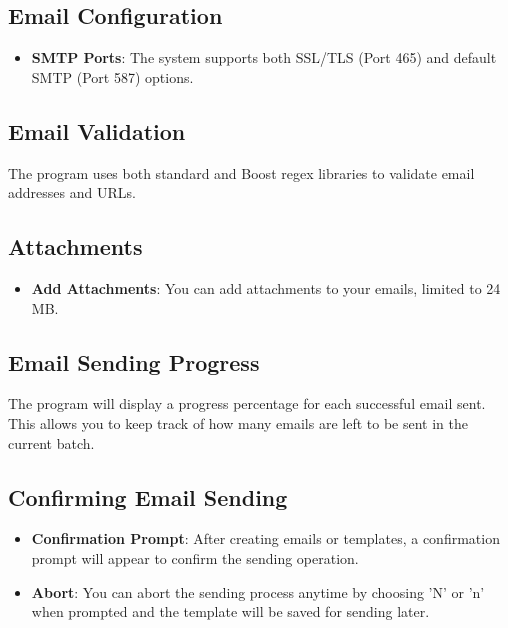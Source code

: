 \documentclass{article}
\begin{document}
	\subsection{Email Configuration}
	
	\begin{itemize}
		\item \textbf{SMTP Ports}: The system supports both SSL/TLS (Port 465) and default SMTP (Port 587) options.
	\end{itemize}
	
	\subsection{Email Validation}
	
	The program uses both standard and Boost regex libraries to validate email addresses and URLs.
	
	\subsection{Attachments}
	
	\begin{itemize}
		\item \textbf{Add Attachments}: You can add attachments to your emails, limited to 24 MB.
	\end{itemize}
	
	\subsection{Email Sending Progress}
	
	The program will display a progress percentage for each successful email sent. This allows you to keep track of how many emails are left to be sent in the current batch.
	
	\subsection{Confirming Email Sending}
	
	\begin{itemize}
		\item \textbf{Confirmation Prompt}: After creating emails or templates, a confirmation prompt will appear to confirm the sending operation.
		\item \textbf{Abort}: You can abort the sending process anytime by choosing 'N' or 'n' when prompted and the template will be saved for sending later.
	\end{itemize}
	
\end{document}

